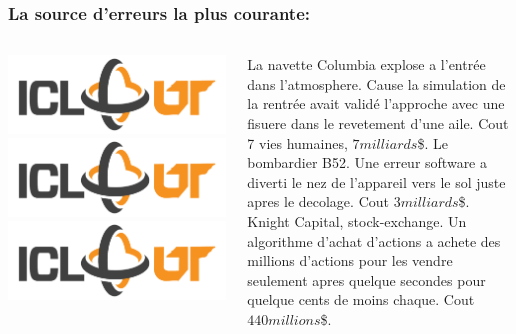 \documentclass{beamer}
\begin{document}
\begin{frame} 
  \frametitle{La source d'erreurs la plus courante:}
  \begin{columns}
    \begin{column}{6cm}
      \begin{overprint}[6cm]
        \includegraphics[scale=0.3]{ICL-slide-logo}
        \includegraphics[scale=0.3]{ICL-slide-logo}
        \includegraphics[scale=0.225]{ICL-slide-logo}
      \end{overprint}
    \end{column}
    \begin{column}{3cm}
      \begin{scriptsize}
        \begin{overprint}[3cm]
           La navette Columbia explose a l'entrée dans l'atmosphere. Cause la simulation de la rentrée avait validé l'approche avec une fisuere dans le revetement d'une aile. Cout 7 vies humaines, $7 milliards$\$.
           Le bombardier B52. Une erreur software a diverti le nez de l'appareil vers le sol juste apres le decolage. Cout $3 milliards$\$.
           Knight Capital, stock-exchange. Un algorithme d'achat d'actions a achete des millions d'actions pour les vendre seulement apres quelque secondes pour quelque cents de moins chaque. Cout $440 millions$\$.
        \end{overprint}
      \end{scriptsize}
    \end{column}
  \end{columns}
\end{frame}
\end{document}
